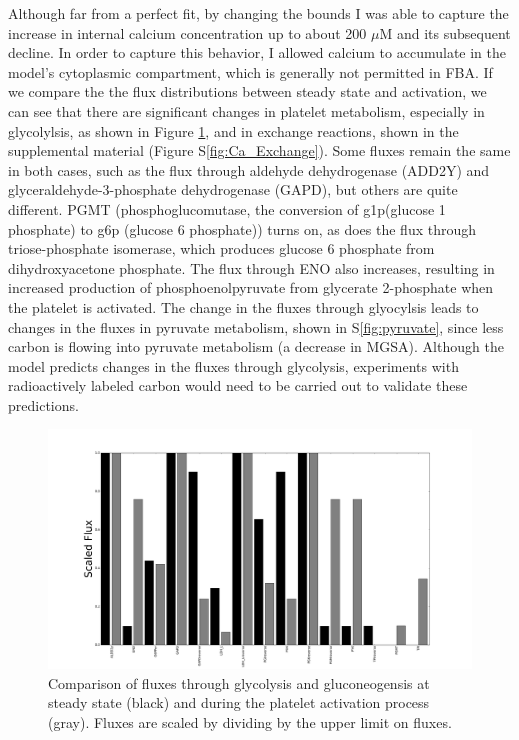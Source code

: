 \documentclass[11pt]{article}
\begin{document}
Although far from a perfect fit, by changing the bounds I was able to capture the increase in internal calcium concentration up to about 200 $\mu$M and its subsequent decline. In order to capture this behavior, I allowed calcium to accumulate in the model's cytoplasmic compartment, which is generally not permitted in FBA. If we compare the the flux distributions between steady state and activation, we can see that there are significant changes in platelet metabolism, especially in glycolylsis, as shown in Figure \ref{fig:Ca_glycolysis}, and in exchange reactions, shown in the supplemental material (Figure S\ref{fig:Ca_Exchange}). Some fluxes remain the same in both cases, such as the flux through aldehyde dehydrogenase (ADD2Y) and glyceraldehyde-3-phosphate dehydrogenase (GAPD), but others are quite different. PGMT (phosphoglucomutase, the conversion of g1p(glucose 1 phosphate) to g6p (glucose 6 phosphate)) turns on, as does the flux through triose-phosphate isomerase, which produces glucose 6 phosphate from dihydroxyacetone phosphate. The flux through ENO also increases, resulting in increased production of phosphoenolpyruvate from glycerate 2-phosphate when the platelet is activated. The change in the fluxes through glyocylsis leads to changes in the fluxes in pyruvate metabolism, shown in S\ref{fig:pyruvate}, since less carbon is flowing into pyruvate metabolism (a decrease in MGSA). Although the model predicts changes in the fluxes through glycolysis, experiments with radioactively labeled carbon would need to be carried out to validate these predictions. 
\begin{figure}
\centering
\hspace{-2cm}
\includegraphics[scale=.25]{../figures/Ca_barGlycolysis_Gluconeogenesis}
\caption{Comparison of fluxes through glycolysis and gluconeogensis at steady state (black) and during the platelet activation process (gray). Fluxes are scaled by dividing by the upper limit on fluxes.}
\label{fig:Ca_glycolysis}
\end{figure}
\end{document}

